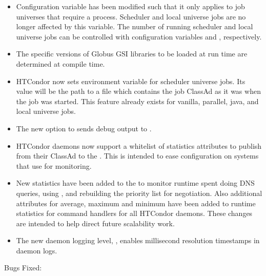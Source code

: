 \begin{itemize}
\item Configuration variable  has been
modified such that it only applies to job universes that require a
 process.
Scheduler and local universe jobs are no longer affected by this
variable.
The number of running scheduler and local universe jobs can be controlled
with configuration variables  and
, respectively.

\item The specific versions of Globus GSI libraries to be loaded at run time
are determined at compile time. 

\item HTCondor now sets environment variable  for
scheduler universe jobs. 
Its value will be the path to a file which contains
the job ClassAd as it was when the job was started.
This feature already exists for vanilla, parallel, java, and local
universe jobs.

\item The new  option to  sends
debug output to .

\item HTCondor daemons now support a whitelist of statistics attributes to
publish from their ClassAd to the .  
This is intended to ease
configuration on systems that use  for monitoring.

\item New statistics have been added to the  to monitor runtime
spent doing DNS queries, using , 
and rebuilding the priority list for negotiation.  
Also additional attributes for average, maximum and minimum
have been added to runtime statistics for command handlers 
for all HTCondor daemons.
These changes are intended to help direct future scalability work.

\item The new daemon logging level, , 
enables millisecond resolution timestamps in daemon logs.

\end{itemize}

\noindent Bugs Fixed:

